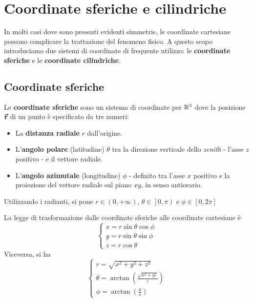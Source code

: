 \section{Coordinate sferiche e cilindriche}
In molti casi dove sono presenti evidenti simmetrie, le coordinate cartesiane possono complicare la trattazione del fenomeno fisico. A questo scopo introduciamo due sistemi di coordinate di frequente utilizzo: le \textbf{coordinate sferiche} e le \textbf{coordinate cilindriche}.
\subsection{Coordinate sferiche}
\begin{define}
	Le \textbf{coordinate sferiche} sono un sistema di coordinate per $\mathbb{R}^3$ dove la posizione $\vb*{\va{r}}$ di un punto è specificato da tre numeri:
	\begin{itemize}
		\item La \textbf{distanza radiale} $r$ dall'origine.
		\item L'\textbf{angolo polare} (latitudine) $\theta$ tra la direzione verticale dello \textit{zenith} - l'asse $z$ positivo - e il vettore radiale.
		\item L'\textbf{angolo azimutale} (longitudine) $\phi$ - definito tra l'asse $x$ positivo e la proiezione del vettore radiale sul piano $xy$, in senso antiorario.
	\end{itemize}
	Utilizzando i radianti, si pone $r\in\left(0,+\infty\right)$, $\theta\in\left[0,\pi\right)$ e $\phi\in\left[0,2\pi\right]$
\end{define}
La legge di trasformazione dalle coordinate sferiche alle coordinate cartesiane è
\begin{equation}
	\begin{cases}
		x=r\sin\theta\cos\phi\\
		y=r\sin\theta\sin\phi\\
		z=r\cos\theta
	\end{cases}
\end{equation}
Viceversa, si ha
\begin{equation}
	\begin{cases}
		r=\sqrt{x^2+y^2+z^2}\\
		\theta=\arctan\left(\frac{\sqrt{x^2+y^2}}{z}\right)\\
		\phi=\arctan{\left(\frac{y}{x}\right)}
	\end{cases}
\end{equation}

